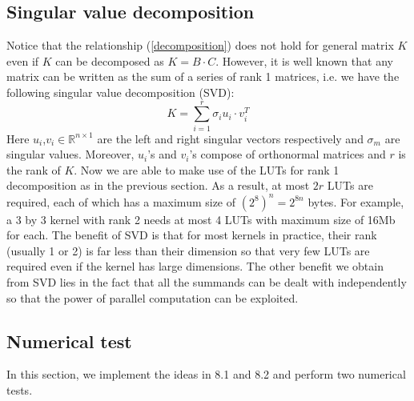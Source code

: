 \documentclass[12pt]{amsart}
\theoremstyle{definition}
\theoremstyle{remark}
\numberwithin{thm}{section}
\begin{document}
\subsection{Singular value decomposition}
Notice that the relationship (\ref{decomposition}) does not hold for general matrix $K$ even if $K$ can be decomposed as $K=B\cdot C$. However, it is well known that any matrix can be written as the sum of a series of rank 1 matrices, i.e. we have the following singular value decomposition (SVD): 
\[K=\sum_{i=1}^{r}\sigma_i u_i\cdot v_i^T\]
Here $u_i$,$v_i\in\mathbb{R}^{n\times 1}$ are the left and right singular vectors respectively and $\sigma_m$ are singular values. Moreover, $u_i$'s and $v_i$'s compose of orthonormal matrices and $r$ is the rank of $K$. Now we are able to make use of the LUTs for rank 1 decomposition as in the previous section. As a result, at most $2r$ LUTs are required, each of which has a maximum size of $(2^8)^n=2^{8n}$ bytes. For example, a 3 by 3 kernel with rank 2 needs at most 4 LUTs with maximum size of 16Mb for each. The benefit of SVD is that for most kernels in practice, their rank (usually 1 or 2) is far less than their dimension so that very few LUTs are required even if the kernel has large dimensions. The other benefit we obtain from SVD lies in the fact that all the summands can be dealt with independently so that the power of parallel computation can be exploited. 
\subsection{Numerical test}
In this section, we implement the ideas in 8.1 and 8.2 and perform two numerical tests. 
\end{document}
